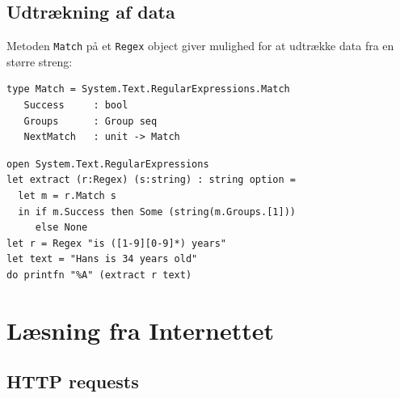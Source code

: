 \documentclass[rgb]{beamer}
\begin{document}
\subsection{Udtrækning af data}

\begin{frame}[fragile]
\begin{footnotesize}

  Metoden \lstinline{Match} på et \lstinline{Regex} object giver
  mulighed for at udtrække data fra en større streng:

\begin{lstlisting}[numbers=none,frame=none]
type Match = System.Text.RegularExpressions.Match
   Success     : bool
   Groups      : Group seq
   NextMatch   : unit -> Match
\end{lstlisting}


\vspace{1ex}
\begin{lstlisting}[numbers=none,frame=none]
open System.Text.RegularExpressions
let extract (r:Regex) (s:string) : string option =
  let m = r.Match s
  in if m.Success then Some (string(m.Groups.[1]))
     else None
let r = Regex "is ([1-9][0-9]*) years"
let text = "Hans is 34 years old"
do printfn "%A" (extract r text)
\end{lstlisting}
\end{footnotesize}
\end{frame}

\section{Læsning fra Internettet}

\subsection{HTTP requests}
\end{document}
